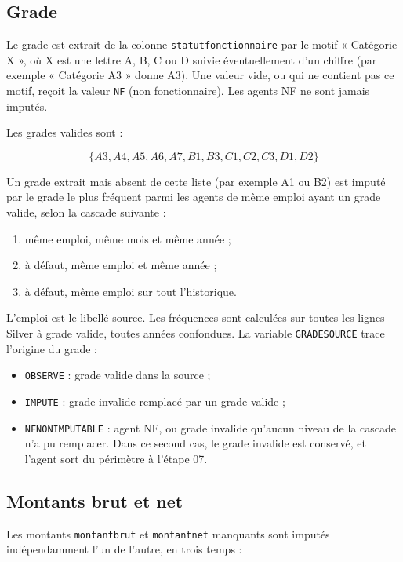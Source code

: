 \documentclass[12pt,a4paper,french]{article}
\renewcommand{\_}{\underscoreorigine\allowbreak}
\begin{document}
\subsection{Grade}

Le grade est extrait de la colonne \texttt{statut\_fonctionnaire} par le motif « Catégorie X », où X est une lettre A, B, C ou D suivie éventuellement d'un chiffre (par exemple « Catégorie A3 » donne A3). Une valeur vide, ou qui ne contient pas ce motif, reçoit la valeur \texttt{NF} (non fonctionnaire). Les agents NF ne sont jamais imputés.

Les grades valides sont :

\[
\{A3,A4,A5,A6,A7,B1,B3,C1,C2,C3,D1,D2\}
\]

Un grade extrait mais absent de cette liste (par exemple A1 ou B2) est imputé par le grade le plus fréquent parmi les agents de même emploi ayant un grade valide, selon la cascade suivante :

\begin{enumerate}
    \item même emploi, même mois et même année ;
    \item à défaut, même emploi et même année ;
    \item à défaut, même emploi sur tout l'historique.
\end{enumerate}

L'emploi est le libellé source. Les fréquences sont calculées sur toutes les lignes Silver à grade valide, toutes années confondues. La variable \texttt{GRADE\_SOURCE} trace l'origine du grade :

\begin{itemize}
    \item \texttt{OBSERVE} : grade valide dans la source ;
    \item \texttt{IMPUTE} : grade invalide remplacé par un grade valide ;
    \item \texttt{NF\_NON\_IMPUTABLE} : agent NF, ou grade invalide qu'aucun niveau de la cascade n'a pu remplacer. Dans ce second cas, le grade invalide est conservé, et l'agent sort du périmètre à l'étape 07.
\end{itemize}

\subsection{Montants brut et net}

Les montants \texttt{montant\_brut} et \texttt{montant\_net} manquants sont imputés indépendamment l'un de l'autre, en trois temps :
\end{document}
